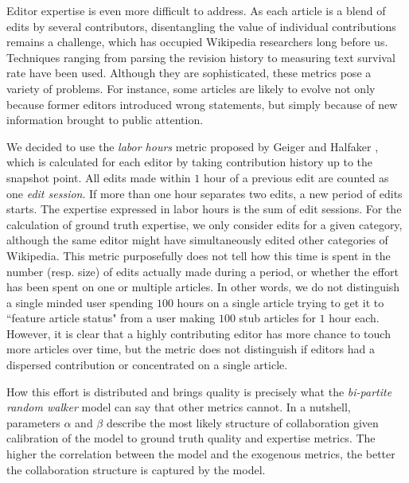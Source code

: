 Editor expertise is even more difficult to address. As each article is a blend of edits by several contributors, disentangling the value of individual contributions remains a challenge, which has occupied Wikipedia researchers long before us. Techniques ranging from parsing the revision history to measuring text survival rate \cite{adler2008measuringauthor} have been used. Although they are sophisticated, these metrics pose a variety of problems. For instance, some articles are likely to evolve not only because former editors introduced wrong statements, but simply because of new information brought to public attention. 

We decided to use the {\it labor hours} metric proposed by Geiger and Halfaker \cite{geiger2013}, which is calculated for each editor by taking contribution history up to the snapshot point. All edits made within $1$ hour of a previous edit are counted as one {\it edit session}. If more than one hour separates two edits, a new period of edits  starts. The expertise expressed in labor hours is the sum of edit sessions. For the calculation of ground truth expertise, we only consider edits for a given category, although the same editor might have simultaneously  edited other categories of Wikipedia. This metric purposefully does not tell how this time is spent in the number (resp. size) of edits actually made during a period, or whether the effort has been spent on one or multiple articles. In other words, we do not distinguish a single minded user spending $100$ hours on a single article trying to get it to ``feature article status" from a user making $100$ stub articles for $1$ hour each.  However, it is clear that a highly contributing editor has more chance to touch more articles over time, but the metric does not distinguish if editors had a dispersed contribution or concentrated on a single article. 

How this effort is distributed and brings quality is precisely what the {\it bi-partite random walker} model can say that other metrics cannot. In a nutshell, parameters $\alpha$ and $\beta$ describe the most likely structure of collaboration given calibration of the model to ground truth quality and expertise metrics. The higher the correlation between the model and the exogenous metrics, the better the collaboration structure is captured by the model. 


